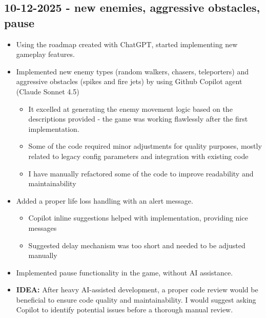 \documentclass[11pt,a4paper]{article}
\begin{document}
\subsection{10-12-2025 - new enemies, aggressive obstacles, pause}
\begin{itemize}
    \item Using the roadmap created with ChatGPT, started implementing new gameplay features.
    
    \item Implemented new enemy types (random walkers, chasers, teleporters) and aggressive obstacles (spikes and fire jets) by using Github Copilot agent (Claude Sonnet 4.5)
    \begin{itemize}
        \item It excelled at generating the enemy movement logic based on the descriptions provided - the game was working flawlessly after the first implementation.
        \item Some of the code required minor adjustments for quality purposes, mostly related to legacy config parameters and integration with existing code
        \item I have manually refactored some of the code to improve readability and maintainability
    \end{itemize}
    
    \item Added a proper life loss handling with an alert message.
    \begin{itemize}
        \item Copilot inline suggestions helped with implementation, providing nice messages
        \item Suggested delay mechanism was too short and needed to be adjusted manually
    \end{itemize}
    
    \item Implemented pause functionality in the game, without AI assistance.
    
    \item \textbf{IDEA:} After heavy AI-assisted development, a proper code review would be beneficial to ensure code quality and maintainability. I would suggest asking Copilot to identify potential issues before a thorough manual review.
\end{itemize}
\end{document}

